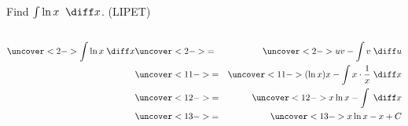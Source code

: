 \begin{frame}
\begin{example} %
Find $\int \ln x \; \; \diff x$. \qquad (LIPET)
\begin{columns}

\begin{column}{.5\textwidth}
%
\end{column}
\begin{column}{.4\textwidth}
\end{column}
\end{columns}
\begin{eqnarray*}
\uncover<2->{\int \ln x\; \diff x} & \uncover<2->{ = } & \uncover<2->{uv - \int v\; \diff u}\\
 & \uncover<11->{ = } & %
\uncover<11->{(\ln x)x - \int x\cdot \frac{1}{x}\; \diff x}\\
 & \uncover<12->{ = } & %
\uncover<12->{x\ln x - \int \; \diff x}\\
 & \uncover<13->{ = } & %
\uncover<13->{x\ln x - x + C}\\
\end{eqnarray*}
\end{example}
\end{frame}
